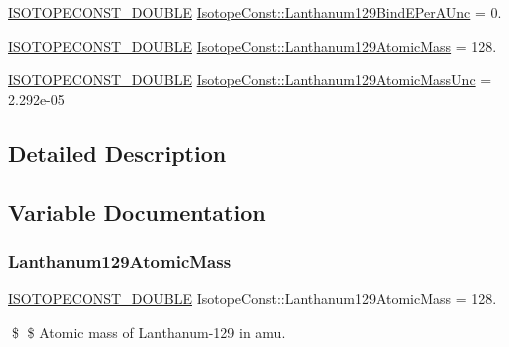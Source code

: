 \begin{DoxyCompactItemize}
\mbox{\hyperlink{group___isotope_const-_macros_ga8f45a7272ce02c0b4c65c44636ed719a}{I\+S\+O\+T\+O\+P\+E\+C\+O\+N\+S\+T\+\_\+\+D\+O\+U\+B\+LE}} \mbox{\hyperlink{group___isotope_const-_lanthanum-_la129_gaca6861c78f576d6835e656f93bf45461}{Isotope\+Const\+::\+Lanthanum129\+Bind\+E\+Per\+A\+Unc}} = 0.
\item 
\mbox{\hyperlink{group___isotope_const-_macros_ga8f45a7272ce02c0b4c65c44636ed719a}{I\+S\+O\+T\+O\+P\+E\+C\+O\+N\+S\+T\+\_\+\+D\+O\+U\+B\+LE}} \mbox{\hyperlink{group___isotope_const-_lanthanum-_la129_ga0cd6709b8585aefbe6c893f749545ba3}{Isotope\+Const\+::\+Lanthanum129\+Atomic\+Mass}} = 128.
\item 
\mbox{\hyperlink{group___isotope_const-_macros_ga8f45a7272ce02c0b4c65c44636ed719a}{I\+S\+O\+T\+O\+P\+E\+C\+O\+N\+S\+T\+\_\+\+D\+O\+U\+B\+LE}} \mbox{\hyperlink{group___isotope_const-_lanthanum-_la129_ga77a4412cbd98d4a64dc78388345967ab}{Isotope\+Const\+::\+Lanthanum129\+Atomic\+Mass\+Unc}} = 2.\+292e-\/05
\end{DoxyCompactItemize}


\subsection{Detailed Description}


\subsection{Variable Documentation}
\mbox{\label{group___isotope_const-_lanthanum-_la129_ga0cd6709b8585aefbe6c893f749545ba3}} 
\subsubsection{\texorpdfstring{Lanthanum129\+Atomic\+Mass}{Lanthanum129AtomicMass}}
{\footnotesize\ttfamily \mbox{\hyperlink{group___isotope_const-_macros_ga8f45a7272ce02c0b4c65c44636ed719a}{I\+S\+O\+T\+O\+P\+E\+C\+O\+N\+S\+T\+\_\+\+D\+O\+U\+B\+LE}} Isotope\+Const\+::\+Lanthanum129\+Atomic\+Mass = 128.}

\$ \$ Atomic mass of Lanthanum-\/129 in amu. \mbox{\label{group___isotope_const-_lanthanum-_la129_ga77a4412cbd98d4a64dc78388345967ab}} 
